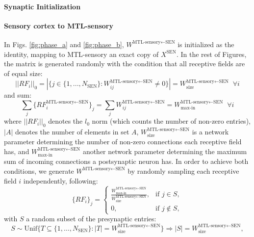 \documentclass{article}
\begin{document}
\paragraph{Synaptic Initialization}
\paragraph{Sensory cortex to MTL-sensory}
In Figs. \ref{fig:phase_a} and \ref{fig:phase_b}, $W^{\textrm{MTL-sensory}\leftarrow\textrm{SEN}}$ is initialized as the identity, mapping to MTL-sensory an exact copy of $X^\textrm{SEN}$. In the rest of Figures, the matrix is generated randomly with the condition that all receptive fields are of equal size:
\begin{equation}
    || RF_i ||_0 = |\{j \in \{1, ..., N_\textrm{SEN}\} : W^{\textrm{MTL-sensory}\leftarrow\textrm{SEN}}_{ij} \neq 0\}| = W^{\textrm{MTL-sensory}\leftarrow\textrm{SEN}}_\textrm{size}\;\; \forall i
\end{equation}
and sum:
\begin{equation}
    \sum_j\{RF_i^{\textrm{MTL-sensory}\leftarrow\textrm{SEN}}\}_j = \sum_jW^{\textrm{MTL-sensory}\leftarrow\textrm{SEN}}_{ij} = W^{\textrm{MTL-sensory}\leftarrow\textrm{SEN}}_\textrm{max-in}\;\; \forall i
\end{equation}
where $|| RF_i ||_0$ denotes the $l_0$ norm (which counts the number of non-zero entries), $|A|$ denotes the number of elements in set $A$, $W^{\textrm{MTL-sensory}\leftarrow\textrm{SEN}}_\textrm{size}$ is a network parameter determining the number of non-zero connections each receptive field has, and $W^{\textrm{MTL-sensory}\leftarrow\textrm{SEN}}_\textrm{max-in}$ another network parameter determining the maximum sum of incoming connections a postsynaptic neuron has. In order to achieve both conditions, we generate $W^{\textrm{MTL-sensory}\leftarrow\textrm{SEN}}$ by randomly sampling each receptive field $i$ independently, following:
\begin{equation}
    \{RF_i\}_j =
\begin{cases}
\frac{W^{\textrm{MTL-sensory}\leftarrow\textrm{SEN}}_\textrm{max-in}}{W^{\textrm{MTL-sensory}\leftarrow\textrm{SEN}}_\textrm{size}}, & \text{if } j \in S, \\
0, & \text{if } j \notin S,
\end{cases}
\end{equation}
with $S$ a random subset of the presynaptic entries:
\begin{equation} 
S \sim \text{Unif}\big\{ T \subseteq \{1,\dots,N_\textrm{SEN}\} : |T| = W^{\textrm{MTL-sensory}\leftarrow\textrm{SEN}}_\textrm{size} \big\} \Longrightarrow  |S| = W^{\textrm{MTL-sensory}\leftarrow\textrm{SEN}}_\textrm{size}, 
\end{equation}
\end{document}
